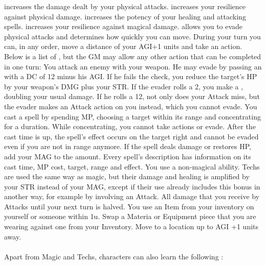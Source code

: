  increases the damage dealt by your physical attacks. \ofrow
{} increases your resilience against physical damage. \ofrow
{} increases the potency of your healing and attacking spells. \ofrow
{} increases your resilience against magical damage. \ofrow
{} allows you to evade physical attacks and determines how quickly you can move.
%
\newpage
%
During your turn you can, in any order, move a distance of your AGI+1 units and take an action.
Below is a list of , but the GM may allow any other action that can be completed in one turn:\ofgap
%
You attack an enemy with your weapon. 
He may evade by passing an  with a DC of 12 minus his AGI. 
If he fails the check, you reduce the target's HP by your weapon's DMG plus your STR.
If the evader rolls a 2, you make a , doubling your usual damage. 
If he rolls a 12, not only does your Attack miss, but the evader makes an Attack action on you instead, which you cannot evade.\ofgap
%
You cast a spell by spending MP, choosing a target within its range and concentrating for a duration.
While concentrating, you cannot take actions or evade. 
After the cast time is up, the spell's effect occurs on the target right  and cannot be evaded even if you are not in range anymore.
If the spell deals damage or restores HP, add your MAG to the amount.
Every spell's description has information on its cast time, MP cost, target, range and effect.\ofgap
%
You use a non-magical ability. 
Techs are used the same way as magic, but their damage and healing is amplified by your STR instead of your MAG, 
except if their use already includes this bonus in another way, for example by involving an Attack.\ofgap
%
 All damage that you receive by Attacks until your next turn is halved. \ofgap
%
 You use an Item from your inventory on yourself or someone within 1u.\ofgap
%
 Swap a Materia or Equipment piece that you are wearing against one from your Inventory.\ofgap
%
 Move to a location up to AGI +1 units away.\\\\
%
Apart from Magic and Techs, characters can also learn the following : \ofrow
